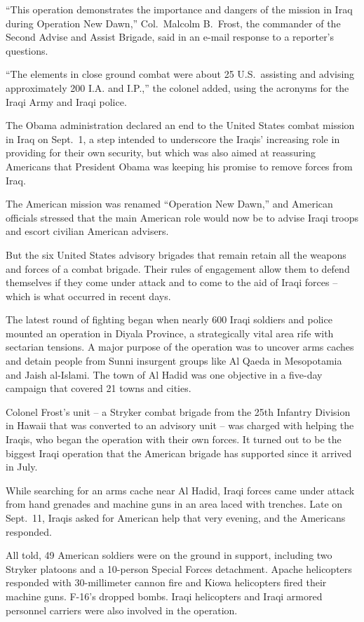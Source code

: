 ﻿\documentclass[12pt]{article}
\begin{document}
``This operation demonstrates the importance and dangers of the mission in Iraq during Operation New
Dawn,'' Col.~Malcolm B.~Frost, the commander of the Second Advise and Assist Brigade, said in an
e-mail response to a reporter's questions.

``The elements in close ground combat were about 25 U.S.~assisting and advising approximately 200
I.A. and I.P.,'' the colonel added, using the acronyms for the Iraqi Army and Iraqi police.

The Obama administration declared an end to the United States combat mission in Iraq on Sept.~1, a
step intended to underscore the Iraqis' increasing role in providing for their own security, but
which was also aimed at reassuring Americans that President Obama was keeping his promise to remove
forces from Iraq.

The American mission was renamed ``Operation New Dawn,'' and American officials stressed that the
main American role would now be to advise Iraqi troops and escort civilian American advisers.

But the six United States advisory brigades that remain retain all the weapons and forces of a
combat brigade. Their rules of engagement allow them to defend themselves if they come under attack
and to come to the aid of Iraqi forces -- which is what occurred in recent days.

The latest round of fighting began when nearly 600 Iraqi soldiers and police mounted an operation in
Diyala Province, a strategically vital area rife with sectarian tensions. A major purpose of the
operation was to uncover arms caches and detain people from Sunni insurgent groups like Al Qaeda in
Mesopotamia and Jaish al-Islami. The town of Al Hadid was one objective in a five-day campaign that
covered 21 towns and cities.

Colonel Frost's unit -- a Stryker combat brigade from the 25th Infantry Division in Hawaii that was
converted to an advisory unit -- was charged with helping the Iraqis, who began the operation with
their own forces. It turned out to be the biggest Iraqi operation that the American brigade has
supported since it arrived in July.

While searching for an arms cache near Al Hadid, Iraqi forces came under attack from hand grenades
and machine guns in an area laced with trenches. Late on Sept.~11, Iraqis asked for American help
that very evening, and the Americans responded.

All told, 49 American soldiers were on the ground in support, including two Stryker platoons and a
10-person Special Forces detachment. Apache helicopters responded with 30-millimeter cannon fire and
Kiowa helicopters fired their machine guns. F-16's dropped bombs. Iraqi helicopters and Iraqi
armored personnel carriers were also involved in the operation.
\end{document}
